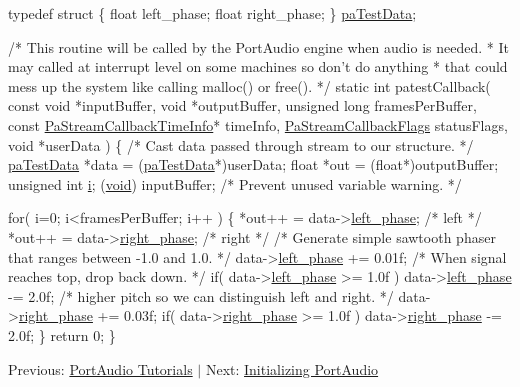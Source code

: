 \begin{DoxyCode}
\textcolor{keyword}{typedef} \textcolor{keyword}{struct}
\{
    \textcolor{keywordtype}{float} left\_phase;
    \textcolor{keywordtype}{float} right\_phase;
\}   
\hyperlink{patest__clip_8c_a0b6204bada21caa804fccecf238a2d8f}{paTestData};

\textcolor{comment}{/* This routine will be called by the PortAudio engine when audio is needed.}
\textcolor{comment}{ * It may called at interrupt level on some machines so don't do anything}
\textcolor{comment}{ * that could mess up the system like calling malloc() or free().}
\textcolor{comment}{*/} 
\textcolor{keyword}{static} \textcolor{keywordtype}{int} patestCallback( \textcolor{keyword}{const} \textcolor{keywordtype}{void} *inputBuffer, \textcolor{keywordtype}{void} *outputBuffer,
                           \textcolor{keywordtype}{unsigned} \textcolor{keywordtype}{long} framesPerBuffer,
                           \textcolor{keyword}{const} \hyperlink{struct_pa_stream_callback_time_info}{PaStreamCallbackTimeInfo}* timeInfo,
                           \hyperlink{portaudio_8h_a55a005924bcfa0424594f4f65cd4ae82}{PaStreamCallbackFlags} statusFlags,
                           \textcolor{keywordtype}{void} *userData )
\{
    \textcolor{comment}{/* Cast data passed through stream to our structure. */}
    \hyperlink{structpa_test_data}{paTestData} *data = (\hyperlink{structpa_test_data}{paTestData}*)userData; 
    \textcolor{keywordtype}{float} *out = (\textcolor{keywordtype}{float}*)outputBuffer;
    \textcolor{keywordtype}{unsigned} \textcolor{keywordtype}{int} \hyperlink{checksum_8c_ab80e330a3bc9e38c1297fe17381e92b4}{i};
    (\hyperlink{lib_2expat_8h_a3980d15795c6349fecd06c1b035c1ae9}{void}) inputBuffer; \textcolor{comment}{/* Prevent unused variable warning. */}
    
    \textcolor{keywordflow}{for}( i=0; i<framesPerBuffer; i++ )
    \{
        *out++ = data->\hyperlink{structpa_test_data_a7395cffc18c4a1734f7e857f21ca1a9b}{left\_phase};  \textcolor{comment}{/* left */}
        *out++ = data->\hyperlink{structpa_test_data_ac76fb867d4b48bfea1554ad15b5dcf64}{right\_phase};  \textcolor{comment}{/* right */}
        \textcolor{comment}{/* Generate simple sawtooth phaser that ranges between -1.0 and 1.0. */}
        data->\hyperlink{structpa_test_data_a7395cffc18c4a1734f7e857f21ca1a9b}{left\_phase} += 0.01f;
        \textcolor{comment}{/* When signal reaches top, drop back down. */}
        \textcolor{keywordflow}{if}( data->\hyperlink{structpa_test_data_a7395cffc18c4a1734f7e857f21ca1a9b}{left\_phase} >= 1.0f ) data->\hyperlink{structpa_test_data_a7395cffc18c4a1734f7e857f21ca1a9b}{left\_phase} -= 2.0f;
        \textcolor{comment}{/* higher pitch so we can distinguish left and right. */}
        data->\hyperlink{structpa_test_data_ac76fb867d4b48bfea1554ad15b5dcf64}{right\_phase} += 0.03f;
        \textcolor{keywordflow}{if}( data->\hyperlink{structpa_test_data_ac76fb867d4b48bfea1554ad15b5dcf64}{right\_phase} >= 1.0f ) data->\hyperlink{structpa_test_data_ac76fb867d4b48bfea1554ad15b5dcf64}{right\_phase} -= 2.0f;
    \}
    \textcolor{keywordflow}{return} 0;
\}
\end{DoxyCode}


Previous\+: \hyperlink{tutorial_start}{Port\+Audio Tutorials} $\vert$ Next\+: \hyperlink{initializing_portaudio}{Initializing Port\+Audio} 